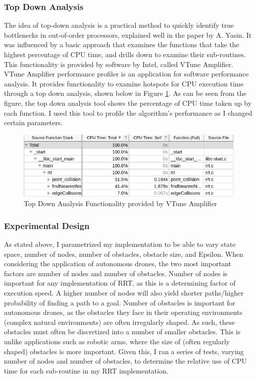 \subsubsection{Top Down Analysis}{}

The idea of top-down analysis is a practical method to quickly identify true bottlenecks in out-of-order processors, explained well in the paper by A. Yasin\cite{Yasin2014}. It was influenced by a basic approach that examines the functions that take the highest percentage of CPU time, and drills down to examine their sub-routines. This functionality is provided by software by Intel, called VTune Amplifier. \\

VTune Amplifier performance profiler is an application for software performance analysis. It provides functionality to examine hotspots for CPU execution time through a top down analysis, shown below in Figure \ref{fig:topdown}. As can be seen from the figure, the top down analysis tool shows the percentage of CPU time taken up by each function. I used this tool to profile the algorithm's performance as I changed certain parameters.

\begin{figure}[H]
\begin{center}
\includegraphics[width=0.8\linewidth]{../master/rrt/img/topDownAnalysis.png}
\caption{Top Down Analysis Functionality provided by VTune Amplifier}
\label{fig:topdown}
\end{center}
\end{figure}


\subsubsection{Experimental Design}

As stated above, I parametrized my implementation to be able to vary state space, number of nodes, number of obstacles, obstacle size, and  Epsilon. When considering the application of autonomous drones, the two most important factors are number of nodes and number of obstacles. Number of nodes is important for any implementation of RRT, as this is a determining factor of execution speed. A higher number of nodes will also yield shorter paths/higher probability of finding a path to a goal. Number of obstacles is important for autonomous drones, as the obstacles they face in their operating environments (complex natural environments) are often irregularly shaped. As such, these obstacles must often be discretized into a number of smaller obstacles. This is unlike applications such as robotic arms, where the size of (often regularly shaped) obstacles is more important. Given this, I ran a series of tests, varying number of nodes and number of obstacles, to determine the relative use of CPU time for each sub-routine in my RRT implementation.

